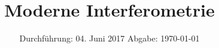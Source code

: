 
\subject{V64}
\title{Moderne Interferometrie}
\date{
  Durchführung: 04. Juni 2017
  \hspace{3em}
  Abgabe: \today
}



\maketitle
\newpage
\mbox{}
\newpage
\thispagestyle{empty}
\tableofcontents
\newpage






\nocite{numpy}
\nocite{matplotlib}
\nocite{uncertainties}
\printbibliography


